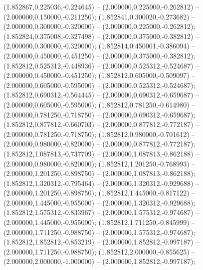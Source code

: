  (1.852867,0.225036,-0.224645) -- (2.000000,0.225000,-0.262812) -- (2.000000,0.150000,-0.211250);
 (1.852841,0.300020,-0.273682) -- (2.000000,0.300000,-0.320000) -- (2.000000,0.225000,-0.262812);
 (1.852824,0.375008,-0.327498) -- (2.000000,0.375000,-0.382812) -- (2.000000,0.300000,-0.320000);
 (1.852814,0.450001,-0.386094) -- (2.000000,0.450000,-0.451250) -- (2.000000,0.375000,-0.382812);
 (1.852812,0.525312,-0.448936) -- (2.000000,0.525312,-0.524687) -- (2.000000,0.450000,-0.451250);
 (1.852812,0.605000,-0.509097) -- (2.000000,0.605000,-0.595000) -- (2.000000,0.525312,-0.524687);
 (1.852812,0.690312,-0.564445) -- (2.000000,0.690312,-0.659687) -- (2.000000,0.605000,-0.595000);
 (1.852812,0.781250,-0.614980) -- (2.000000,0.781250,-0.718750) -- (2.000000,0.690312,-0.659687);
 (1.852812,0.877812,-0.660703) -- (2.000000,0.877812,-0.772187) -- (2.000000,0.781250,-0.718750);
 (1.852812,0.980000,-0.701612) -- (2.000000,0.980000,-0.820000) -- (2.000000,0.877812,-0.772187);
 (1.852812,1.087813,-0.737709) -- (2.000000,1.087813,-0.862188) -- (2.000000,0.980000,-0.820000);
 (1.852812,1.201250,-0.768993) -- (2.000000,1.201250,-0.898750) -- (2.000000,1.087813,-0.862188);
 (1.852812,1.320312,-0.795464) -- (2.000000,1.320312,-0.929688) -- (2.000000,1.201250,-0.898750);
 (1.852812,1.445000,-0.817122) -- (2.000000,1.445000,-0.955000) -- (2.000000,1.320312,-0.929688);
 (1.852812,1.575312,-0.833967) -- (2.000000,1.575312,-0.974687) -- (2.000000,1.445000,-0.955000);
 (1.852812,1.711250,-0.845999) -- (2.000000,1.711250,-0.988750) -- (2.000000,1.575312,-0.974687);
 (1.852812,1.852812,-0.853219) -- (2.000000,1.852812,-0.997187) -- (2.000000,1.711250,-0.988750);
 (1.852812,2.000000,-0.855625) -- (2.000000,2.000000,-1.000000) -- (2.000000,1.852812,-0.997187);
